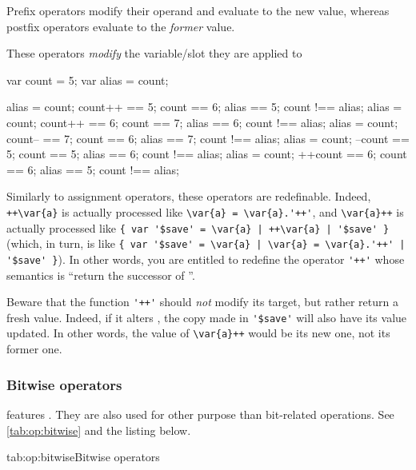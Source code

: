 Prefix operators modify their operand and evaluate to the new value, whereas
postfix operators evaluate to the \emph{former} value.

These operators \emph{modify} the variable/slot they are applied to

\begin{urbiassert}
var count = 5;
var alias = count;

alias = count; count++ == 5; count == 6; alias == 5; count !== alias;
alias = count; count++ == 6; count == 7; alias == 6; count !== alias;
alias = count; count-- == 7; count == 6; alias == 7; count !== alias;
alias = count; --count == 5; count == 5; alias == 6; count !== alias;
alias = count; ++count == 6; count == 6; alias == 5; count !== alias;
\end{urbiassert}

Similarly to assignment operators, these operators are redefinable.  Indeed,
\lstinline|++\var{a}| is actually processed like
\lstinline-\var{a} = \var{a}.'++'-, and \lstinline|\var{a}++| is actually
processed like \lstinline-{ var '$save' = \var{a} | ++\var{a} | '$save' }-
(which, in turn, is like
\lstinline-{ var '$save' = \var{a} | \var{a} = \var{a}.'++' | '$save' }-).
In other words, you are entitled to redefine the operator \lstinline|'++'|
whose semantics is ``return the successor of \this''.

Beware that the function \lstinline|'++'| should \emph{not} modify its
target, but rather return a fresh value.  Indeed, if it alters \this, the
copy made in \lstinline|'$save'| will also have its value updated.  In other
words, the value of \lstinline|\var{a}++| would be its new one, not its
former one.


\subsubsection{Bitwise operators}
\label{sec:lang:op:bitwise}

\us features .  They are also used for other
purpose than bit-related operations. See \autoref{tab:op:bitwise} and the
listing below.

\begin{operatorTable}{tab:op:bitwise}{Bitwise operators}
  \operatorbcompl
  \\\hline
  \operatorlshift\\\operatorrshift
  \\\hline
  \operatorband
  \\\hline
  \operatorbxor
  \\\hline
  \operatorbor
\end{operatorTable}

